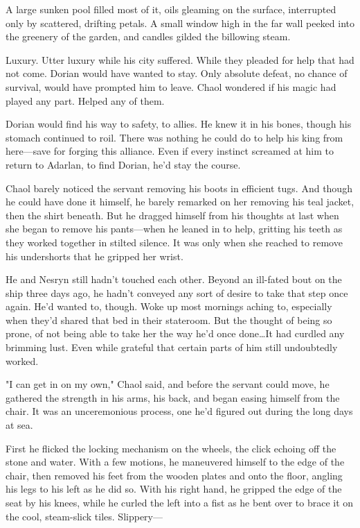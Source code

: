 A large sunken pool filled most of it, oils gleaming on the surface, interrupted only by scattered, drifting petals. A small window high in the far wall peeked into the greenery of the garden, and candles gilded the billowing steam.

Luxury. Utter luxury while his city suffered. While they pleaded for help that had not come. Dorian would have wanted to stay. Only absolute defeat, no chance of survival, would have prompted him to leave. Chaol wondered if his magic had played any part. Helped any of them.

Dorian would find his way to safety, to allies. He knew it in his bones, though his stomach continued to roil. There was nothing he could do to help his king from here---save for forging this alliance. Even if every instinct screamed at him to return to Adarlan, to find Dorian, he'd stay the course.

Chaol barely noticed the servant removing his boots in efficient tugs. And though he could have done it himself, he barely remarked on her removing his teal jacket, then the shirt beneath. But he dragged himself from his thoughts at last when she began to remove his pants---when he leaned in to help, gritting his teeth as they worked together in stilted silence. It was only when she reached to remove his undershorts that he gripped her wrist.

He and Nesryn still hadn't touched each other. Beyond an ill-fated bout on the ship three days ago, he hadn't conveyed any sort of desire to take that step once again. He'd wanted to, though. Woke up most mornings aching to, especially when they'd shared that bed in their stateroom. But the thought of being so prone, of not being able to take her the way he'd once done\ldots It had curdled any brimming lust. Even while grateful that certain parts of him still undoubtedly worked.

"I can get in on my own," Chaol said, and before the servant could move, he gathered the strength in his arms, his back, and began easing himself from the chair. It was an unceremonious process, one he'd figured out during the long days at sea.

First he flicked the locking mechanism on the wheels, the click echoing off the stone and water. With a few motions, he maneuvered himself to the edge of the chair, then removed his feet from the wooden plates and onto the floor, angling his legs to his left as he did so. With his right hand, he gripped the edge of the seat by his knees, while he curled the left into a fist as he bent over to brace it on the cool, steam-slick tiles. Slippery---

